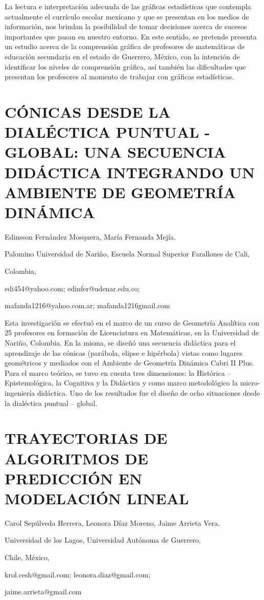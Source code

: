 La lectura e interpretación adecuada de las gráficas estadísticas
que contempla actualmente el currículo escolar mexicano y que se presentan
en los medios de información, nos brindan la posibilidad de tomar
decisiones acerca de sucesos importantes que pasan en nuestro entorno.
En este sentido, se pretende presenta un estudio acerca de la comprensión
gráfica de profesores de matemáticas de educación secundaria en el
estado de Guerrero, México, con la intención de identificar los niveles
de comprensión gráfica, así también las dificultades que presentan
los profesores al momento de trabajar con gráficas estadísticas.


\section{CÓNICAS DESDE LA DIALÉCTICA PUNTUAL - GLOBAL: UNA SECUENCIA DIDÁCTICA
INTEGRANDO UN AMBIENTE DE GEOMETRÍA DINÁMICA}

\begin{datos}

Edinsson Fernández Mosquera, María Fernanda Mejía.

Palomino Universidad de Nariño, Escuela Normal Superior Farallones
de Cali,

Colombia,

edi454@yahoo.com; edinfer@udenar.edu.co;

mafanda1216@yahoo.com.ar; mafanda1216gmail.com

\end{datos}

Esta investigación se efectuó en el marco de un curso de Geometría
Analítica con 25 profesores en formación de Licenciatura en Matemáticas,
en la Universidad de Nariño, Colombia. En la misma, se diseñó una
secuencia didáctica para el aprendizaje de las cónicas (parábola,
elipse e hipérbola) vistas como lugares geométricos y mediados con
el Ambiente de Geometría Dinámica Cabri II Plus. Para el marco teórico,
se tuvo en cuenta tres dimensiones: la Histórica – Epistemológica,
la Cognitiva y la Didáctica y como marco metodológico la micro-ingeniería
didáctica. Uno de los resultados fue el diseño de ocho situaciones
desde la dialéctica puntual – global.


\section{TRAYECTORIAS DE ALGORITMOS DE PREDICCIÓN EN MODELACIÓN LINEAL }

\begin{datos}

Carol Sepúlveda Herrera, Leonora Díaz Moreno, Jaime Arrieta Vera.

Universidad de los Lagos, Universidad Autónoma de Guerrero, 

Chile, México,

krol.cesh@gmail.com; leonora.diaz@gmail.com;

jaime.arrieta@gmail.com

\end{datos}

